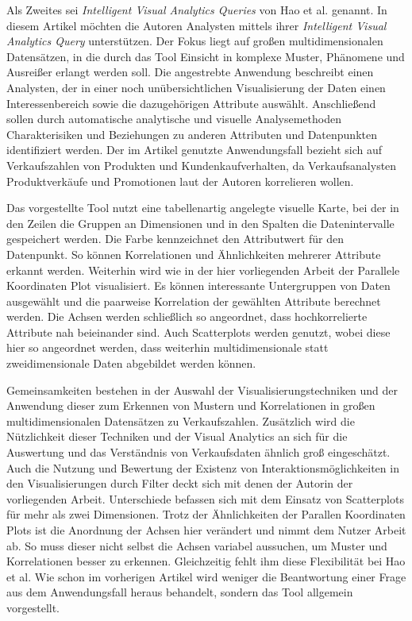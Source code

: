 \documentclass[usegeometry=true]{scrartcl}
\begin{document}
Als Zweites sei \textit{Intelligent Visual Analytics Queries} von Hao et al. genannt.\cite{Hao.2007}
In diesem Artikel möchten die Autoren Analysten mittels ihrer \textit{Intelligent Visual Analytics Query} unterstützen.
Der Fokus liegt auf großen multidimensionalen Datensätzen, in die durch das Tool Einsicht in komplexe Muster, Phänomene und Ausreißer erlangt werden soll.
Die angestrebte Anwendung beschreibt einen Analysten, der in einer noch unübersichtlichen Visualisierung der Daten einen Interessenbereich sowie die dazugehörigen Attribute auswählt.
Anschließend sollen durch automatische analytische und visuelle Analysemethoden Charakterisiken und Beziehungen zu anderen Attributen und Datenpunkten identifiziert werden.
Der im Artikel genutzte Anwendungsfall bezieht sich auf Verkaufszahlen von Produkten und Kundenkaufverhalten, da Verkaufsanalysten Produktverkäufe und Promotionen laut der Autoren korrelieren wollen. 

Das vorgestellte Tool nutzt eine tabellenartig angelegte visuelle Karte, bei der in den Zeilen die Gruppen an Dimensionen und in den Spalten die Datenintervalle gespeichert werden.
Die Farbe kennzeichnet den Attributwert für den Datenpunkt. So können Korrelationen und Ähnlichkeiten mehrerer Attribute erkannt werden.
Weiterhin wird wie in der hier vorliegenden Arbeit der Parallele Koordinaten Plot visualisiert. 
Es können interessante Untergruppen von Daten ausgewählt und die paarweise Korrelation der gewählten Attribute berechnet werden. 
Die Achsen werden schließlich so angeordnet, dass hochkorrelierte Attribute nah beieinander sind. 
Auch Scatterplots werden genutzt, wobei diese hier so angeordnet werden, dass weiterhin multidimensionale statt zweidimensionale Daten abgebildet werden können.

Gemeinsamkeiten bestehen in der Auswahl der Visualisierungstechniken und der Anwendung dieser zum Erkennen von Mustern und Korrelationen in großen multidimensionalen Datensätzen zu Verkaufszahlen.
Zusätzlich wird die Nützlichkeit dieser Techniken und der Visual Analytics an sich für die Auswertung und das Verständnis von Verkaufsdaten ähnlich groß eingeschätzt.
Auch die Nutzung und Bewertung der Existenz von Interaktionsmöglichkeiten in den Visualisierungen durch Filter deckt sich mit denen der Autorin der vorliegenden Arbeit.
Unterschiede befassen sich mit dem Einsatz von Scatterplots für mehr als zwei Dimensionen.
Trotz der Ähnlichkeiten der Parallen Koordinaten Plots ist die Anordnung der Achsen hier verändert und nimmt dem Nutzer Arbeit ab. 
So muss dieser nicht selbst die Achsen variabel aussuchen, um Muster und Korrelationen besser zu erkennen. 
Gleichzeitig fehlt ihm diese Flexibilität bei Hao et al.
Wie schon im vorherigen Artikel wird weniger die Beantwortung einer Frage aus dem Anwendungsfall heraus behandelt, sondern das Tool allgemein vorgestellt.
\end{document}
